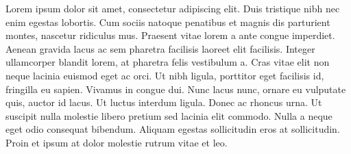 \documentclass[12pt]{report}	%
\begin{document}
\begin{biography}
  Lorem ipsum dolor sit amet, consectetur adipiscing elit. Duis tristique nibh nec enim egestas lobortis. Cum sociis natoque penatibus et magnis dis parturient montes, nascetur ridiculus mus. Praesent vitae lorem a ante congue imperdiet. Aenean gravida lacus ac sem pharetra facilisis laoreet elit facilisis. Integer ullamcorper blandit lorem, at pharetra felis vestibulum a. Cras vitae elit non neque lacinia euismod eget ac orci. Ut nibh ligula, porttitor eget facilisis id, fringilla eu sapien. Vivamus in congue dui. Nunc lacus nunc, ornare eu vulputate quis, auctor id lacus. Ut luctus interdum ligula. Donec ac rhoncus urna. Ut suscipit nulla molestie libero pretium sed lacinia elit commodo. Nulla a neque eget odio consequat bibendum. Aliquam egestas sollicitudin eros at sollicitudin. Proin et ipsum at dolor molestie rutrum vitae et leo.
\end{biography}
\end{document}
